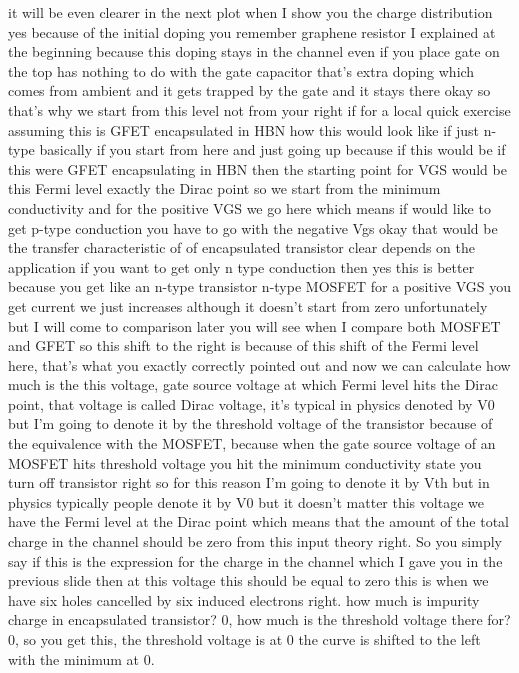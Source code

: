 it will be even clearer in the next plot when I show you the charge distribution yes because of the initial doping you remember graphene resistor I explained at the beginning because this doping stays in the channel even if you place gate on the top has nothing to do with the gate capacitor that's extra doping which comes from ambient and it gets trapped by the gate and it stays there okay so that's why we start from this level not from your right if for a local quick exercise assuming this is GFET encapsulated in HBN how this would look like if just n-type basically if you start from here and just going up because if this would be if this were GFET encapsulating in HBN then the starting point for VGS would be this Fermi level exactly the Dirac point so we start from the minimum conductivity and for the positive VGS we go here which means if would like to get p-type conduction you have to go with the negative Vgs okay that would be the transfer characteristic of of encapsulated transistor clear depends on the application if you want to get only n type conduction then yes this is better because you get like an n-type transistor n-type MOSFET for a positive VGS you get current we just increases although it doesn't start from zero unfortunately but I will come to comparison later you will see when I compare both MOSFET and GFET so this shift to the right is because of this shift of the Fermi level here, that's what you exactly correctly pointed out and now we can calculate how much is the this voltage, gate source voltage at which Fermi level hits the Dirac point, that voltage is called Dirac voltage, it's typical in physics denoted by V0 but I'm going to denote it by the threshold voltage of the transistor because of the equivalence with the MOSFET, because when the gate source voltage of an MOSFET hits threshold voltage you hit the minimum conductivity state you turn off transistor right so for this reason I'm going to denote it by Vth but in physics typically people denote it by V0 but it doesn't matter this voltage we have the Fermi level at the Dirac point which means that the amount of the total charge in the channel should be zero from this input theory right. So you simply say if this is the expression for the charge in the channel which I gave you in the previous slide then at this voltage this should be equal to zero this is when we have six holes cancelled by six induced electrons right. how much is impurity charge in encapsulated transistor? 0, how much is the threshold voltage there for? 0, so you get this, the threshold voltage is at 0 the curve is shifted to the left with the minimum at 0.
